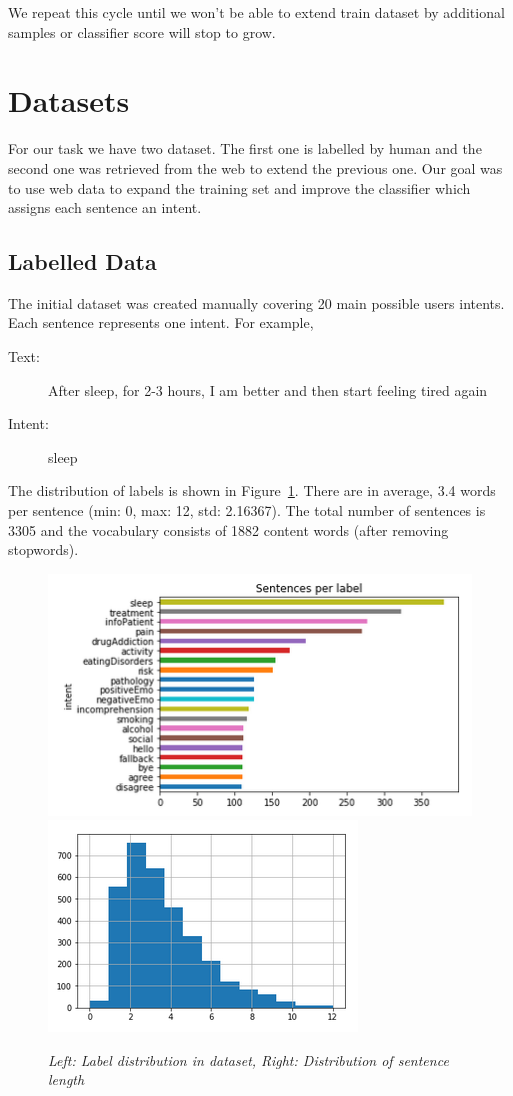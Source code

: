 \documentclass[11pt]{article}
\begin{document}
We repeat this cycle until we won't be able to extend train dataset by additional samples or classifier score will stop to grow.

\section{Datasets}
\label{sec:datasets}

For our task we have two dataset. The first one is labelled by human and the second one was retrieved from the web to extend the previous one. Our goal was to use web data to expand the training set and improve the classifier which assigns each sentence an intent. 

\subsection{Labelled Data}
\label{subsec:labelleddata}
The initial dataset was created manually  covering 20 main possible users intents. Each sentence represents one intent. For example,

\begin{description}
\item[Text:] After sleep, for 2-3 hours, I am better and then start feeling tired again
\item[Intent:] sleep
\end{description}

The distribution of labels is shown in Figure~\ref{figure:name}. There
are in average, 3.4 words per sentence (min: 0, max: 12, std:
2.16367).  The total number of sentences is 3305 and the vocabulary
consists of 1882 content words (after removing stopwords).

 \begin{figure}[h]
 	\centering
 	\includegraphics[scale=0.4]{report1.png}
	\includegraphics[scale=0.45]{report4.png}	
	\caption{\textit{Left: Label distribution in dataset, Right: Distribution of sentence length}}
 \label{figure:name}
 \end{figure}
\FloatBarrier
\end{document}
